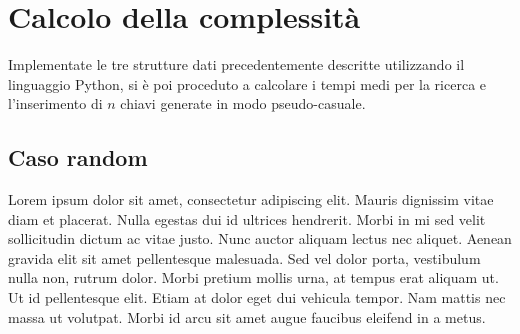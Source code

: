 \documentclass[11pt,a4paper,italian]{article}
\begin{document}
% 

\clearpage

\section{Calcolo della complessità}
Implementate le tre strutture dati precedentemente descritte utilizzando il linguaggio Python, si è poi proceduto a calcolare i tempi medi per la ricerca e l'inserimento di $n$ chiavi generate in modo pseudo-casuale.

\subsection{Caso random}
Lorem ipsum dolor sit amet, consectetur adipiscing elit. Mauris dignissim vitae diam et placerat. Nulla egestas dui id ultrices hendrerit. Morbi in mi sed velit sollicitudin dictum ac vitae justo. Nunc auctor aliquam lectus nec aliquet. Aenean gravida elit sit amet pellentesque malesuada. Sed vel dolor porta, vestibulum nulla non, rutrum dolor. Morbi pretium mollis urna, at tempus erat aliquam ut. Ut id pellentesque elit. Etiam at dolor eget dui vehicula tempor. Nam mattis nec massa ut volutpat. Morbi id arcu sit amet augue faucibus eleifend in a metus.
\end{document}
